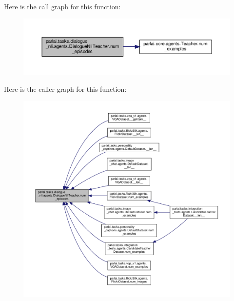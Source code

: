 Here is the call graph for this function\+:
\nopagebreak
\begin{figure}[H]
\begin{center}
\leavevmode
\includegraphics[width=350pt]{classparlai_1_1tasks_1_1dialogue__nli_1_1agents_1_1DialogueNliTeacher_a1277b756af5d3ca234c77526a7bfb5e2_cgraph}
\end{center}
\end{figure}
Here is the caller graph for this function\+:
\nopagebreak
\begin{figure}[H]
\begin{center}
\leavevmode
\includegraphics[width=350pt]{classparlai_1_1tasks_1_1dialogue__nli_1_1agents_1_1DialogueNliTeacher_a1277b756af5d3ca234c77526a7bfb5e2_icgraph}
\end{center}
\end{figure}
\mbox{\label{classparlai_1_1tasks_1_1dialogue__nli_1_1agents_1_1DialogueNliTeacher_a54d9ea8b89d8b5b91c913612fba74726}} 
